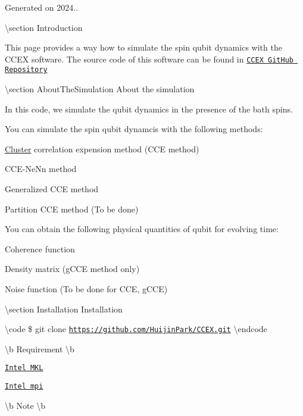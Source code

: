 Generated on 2024..

\textbackslash{}section Introduction

This page provides a way how to simulate the spin qubit dynamics with the C\-C\-E\-X software. The source code of this software can be found in \href{https://github.com/HuijinPark/CCEX}{\tt C\-C\-E\-X Git\-Hub Repository}

\textbackslash{}section About\-The\-Simulation About the simulation

In this code, we simulate the qubit dynamics in the presence of the bath spins.

You can simulate the spin qubit dynamcis with the following methods\-:
\begin{DoxyItemize}
\item \hyperlink{structCluster}{Cluster} correlation expension method (C\-C\-E method)
\item C\-C\-E-\/\-Ne\-Nn method
\item Generalized C\-C\-E method
\item Partition C\-C\-E method (To be done)
\end{DoxyItemize}

You can obtain the following physical quantities of qubit for evolving time\-:
\begin{DoxyItemize}
\item Coherence function
\item Density matrix (g\-C\-C\-E method only)
\item Noise function (To be done for C\-C\-E, g\-C\-C\-E)
\end{DoxyItemize}

\textbackslash{}section Installation Installation

\textbackslash{}code \$ git clone \href{https://github.com/HuijinPark/CCEX.git}{\tt https\-://github.\-com/\-Huijin\-Park/\-C\-C\-E\-X.\-git} \textbackslash{}endcode

\textbackslash{}b Requirement \textbackslash{}b


\begin{DoxyItemize}
\item \href{https://www.intel.com/content/www/us/en/developer/tools/oneapi/onemkl.html}{\tt Intel M\-K\-L}
\item \href{https://www.intel.com/content/www/us/en/developer/tools/oneapi/mpi-library.html}{\tt Intel mpi}
\end{DoxyItemize}

\textbackslash{}b Note \textbackslash{}b


